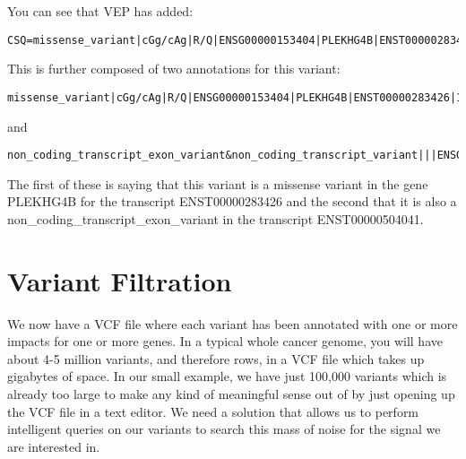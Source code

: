 You can see that VEP has added:

\begin{lstlisting}[breaklines=true,breakatwhitespace=false]
CSQ=missense_variant|cGg/cAg|R/Q|ENSG00000153404|PLEKHG4B|ENST00000283426|16/18|||1076|protein_coding,non_coding_transcript_exon_variant&non_coding_transcript_variant|||ENSG00000153404|PLEKHG4B|ENST00000504041|5/8||||retained_intron
\end{lstlisting}

This is further composed of two annotations for this variant:

\begin{lstlisting}[breaklines=true,breakatwhitespace=false]
missense_variant|cGg/cAg|R/Q|ENSG00000153404|PLEKHG4B|ENST00000283426|16/18|||1076|protein_coding
\end{lstlisting}

and

\begin{lstlisting}[breaklines=true,breakatwhitespace=false]
non_coding_transcript_exon_variant&non_coding_transcript_variant|||ENSG00000153404|PLEKHG4B|ENST00000504041|5/8||||retained_intron
\end{lstlisting}

The first of these is saying that this variant is a missense variant in the gene PLEKHG4B for the transcript ENST00000283426 and the second that it is also a non\_coding\_transcript\_exon\_variant in the transcript ENST00000504041.


\section{Variant Filtration}

We now have a VCF file where each variant has been annotated with one or more impacts for one or more genes. In a typical whole cancer genome, you will have about 4-5 million variants, and therefore rows, in a VCF file which takes up gigabytes of space. In our small example, we have just 100,000 variants which is already too large to make any kind of meaningful sense out of by just opening up the VCF file in a text editor. We need a solution that allows us to perform intelligent queries on our variants to search this mass of noise for the signal we are interested in.

